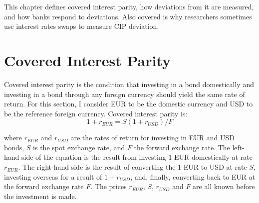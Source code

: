 

% 


This chapter defines covered interest parity, how deviations from it are measured, and how banks respond to deviations.  Also covered is why researchers sometimes use interest rates swaps to measure CIP deviation.  

\section{Covered Interest Parity}

Covered interest parity is the condition that investing in a bond domestically and investing in a bond through any foreign currency should yield the same rate of return.  For this section, I consider EUR to be the domestic currency and USD to be the reference foreign currency.  Covered interest parity is:
\begin{equation} 
  \label{CIP-eqn} 
1 + r_{EUR} = S(1 + r_{USD})/F
\end{equation}

\noindent where $r_{EUR}$ and $r_{USD}$ are the rates of return for investing in EUR and USD bonds, $S$ is the spot exchange rate, and $F$ the forward exchange rate.  The left-hand side of the equation is the result from investing 1 EUR domestically at rate $r_{EUR}$.  The right-hand side is the result of converting the 1 EUR to USD at rate $S$, investing overseas for a result of $1+r_{USD}$, and, finally, converting back to EUR at the forward exchange rate $F$.  The prices $r_{EUR}$, $S$, $r_{USD}$ and $F$ are all known before the investment is made.  

